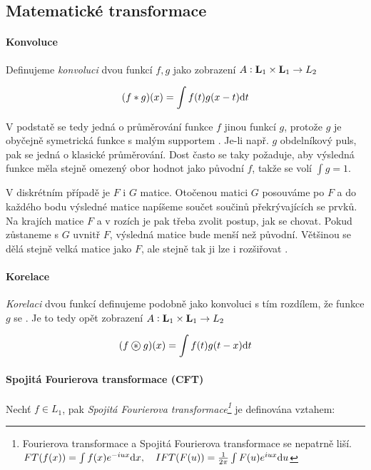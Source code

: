 \subsection{Matematické transformace}

\paragraph{Konvoluce}
Definujeme {\em konvoluci} dvou funkcí $f,g$ jako zobrazení $A: \mathbf{L}_1\times\mathbf{L}_1\rightarrow L_2$

\begin{equation}
(f\ast g)(x)=\int f(t)g(x-t){\rm d} t
\end{equation}

V podstatě se tedy jedná o průměrování funkce $f$ jinou funkcí $g$, protože $g$ je obyčejně symetrická funkce s
malým supportem . Je-li např. $g$ obdelníkový puls, pak se jedná o klasické průměrování. Dost 
často se taky požaduje, aby výsledná funkce měla stejně omezený obor hodnot jako původní $f$, takže se volí $\int g=1$.

V diskrétním případě je $F$ i $G$ matice. Otočenou matici $G$ posouváme po $F$ a do každého bodu výsledné matice
napíšeme součet součinů překrývajících se prvků. Na krajích matice $F$ a v rozích je pak třeba zvolit postup, jak se chovat.
Pokud zůstaneme s $G$ uvnitř $F$, výsledná matice bude menší než původní. Většinou se dělá stejně velká matice jako $F$, ale
stejně tak ji lze i rozšiřovat .

\paragraph{Korelace}

{\em Korelaci} dvou funkcí definujeme podobně jako konvoluci s tím rozdílem, že funkce $g$ se . Je to tedy opět zobrazení $A: \mathbf{L}_1\times\mathbf{L}_1\rightarrow L_2$

\begin{equation}
(f\corr g)(x)=\int f(t)g(t-x)\d t
\end{equation}

\paragraph{Spojitá Fourierova transformace (CFT)}
Nechť $f\in L_1$, pak {\em Spojitá Fourierova transformace\footnote{Fourierova transformace a Spojitá Fourierova transformace se
nepatrně liší.\\$FT(f(x))=\int f(x)e^{-i u x}{\rm d} x,\quad IFT(F(u))=\frac{1}{2\pi}\int F(u)e^{i u x}{\rm d} u$}} je definována vztahem:

